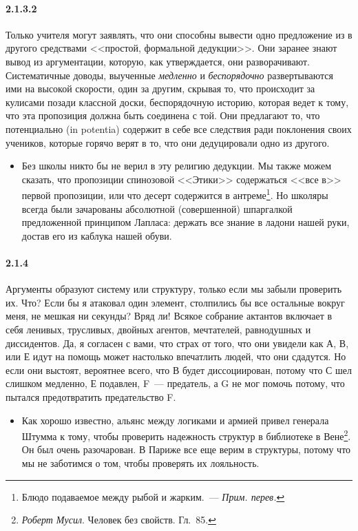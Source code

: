 \paragraph{2.1.3.2}\hypertarget{par:2.1.3.2}{} Только учителя могут заявлять, что они способны вывести одно предложение из в другого средствами <<простой, формальной дедукции>>. Они заранее знают вывод из аргументации, которую, как утверждается, они разворачивают. Систематичные доводы, выученные {\itshape медленно} и {\itshape беспорядочно} развертываются ими на высокой скорости, один за другим, скрывая то, что происходит за кулисами позади классной доски, беспорядочную историю, которая ведет к тому, что эта пропозиция должна быть соединена с той. Они
предлагают то, что потенциально (in potentia) содержит в себе все следствия ради поклонения своих учеников, которые горячо верят в то, что они дедуцировали одно из другого.
	\begin{itemize}
	\item Без школы никто бы не верил в эту религию дедукции. Мы также можем сказать, что пропозиции спинозовой <<Этики>> содержаться <<все в>> первой пропозиции, или что десерт содержится в антреме\footnote{Блюдо подаваемое между рыбой и жарким.~--- {\itshape Прим. перев.}}. Но школяры всегда были зачарованы абсолютной (совершенной) шпаргалкой предложенной принципом Лапласа: держать все знание в ладони нашей руки, достав его из каблука нашей обуви.
	\end{itemize}

\paragraph{2.1.4}\hypertarget{par:2.1.4}{} Аргументы образуют систему или структуру, только если мы забыли проверить их. Что? Если бы я атаковал один элемент, столпились бы все остальные вокруг меня, не мешкая ни секунды? Вряд ли! Всякое собрание актантов включает в себя ленивых, трусливых, двойных агентов, мечтателей, равнодушных и диссидентов. Да, я согласен с вами, что страх от того, что они увидели как А, В, или Е идут на помощь может настолько впечатлить людей, что они сдадутся. Но если они выстоят, вероятнее всего, что В будет
диссоциирован, потому что С шел слишком медленно, Е подавлен, F~--- предатель, а G не мог помочь потому, что пытался предотвратить предательство F. 
	\begin{itemize}
	\item 
	Как хорошо известно, альянс между логиками и армией привел генерала Штумма к тому, чтобы проверить надежность структур в библиотеке в Вене\footnote{{\itshape Роберт Мусил}. Человек без свойств. Гл.~85.}. Он был очень разочарован. В Париже все еще верим в структуры, потому что мы не заботимся о том, чтобы проверять их лояльность.
	\end{itemize}

